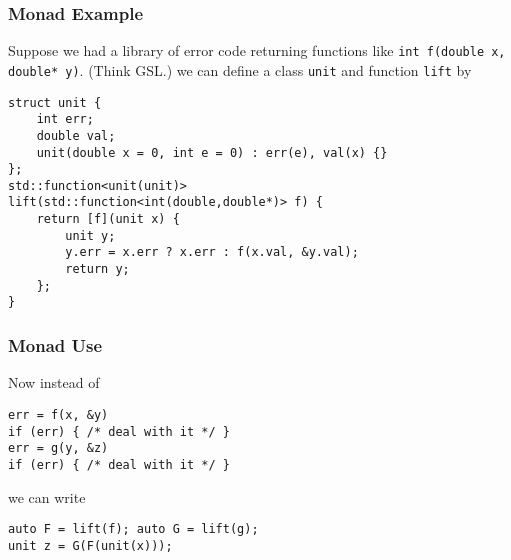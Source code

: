 \documentclass[12pt,fleqn]{beamer}
\begin{document}
\begin{frame}[fragile]
\frametitle{Monad Example}
Suppose we had a library of error code returning functions like
\texttt{int f(double x, double* y)}. (Think GSL.)
we can define a class \texttt{unit} and function \texttt{lift} by
\begin{verbatim}
struct unit {
    int err;
    double val;
    unit(double x = 0, int e = 0) : err(e), val(x) {}
};
std::function<unit(unit)> 
lift(std::function<int(double,double*)> f) {
    return [f](unit x) { 
    	unit y;
    	y.err = x.err ? x.err : f(x.val, &y.val);
        return y;
    };
}
\end{verbatim}
\end{frame}

\begin{frame}[fragile]
\frametitle{Monad Use}
Now instead of 
\begin{verbatim}
err = f(x, &y)
if (err) { /* deal with it */ }
err = g(y, &z)
if (err) { /* deal with it */ }
\end{verbatim}
we can write
\begin{verbatim}
auto F = lift(f); auto G = lift(g);
unit z = G(F(unit(x)));
\end{verbatim}

\end{frame}
\end{document}
